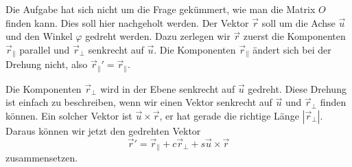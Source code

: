 \begin{diskussion}
Die Aufgabe hat sich nicht um die Frage gekümmert, wie man die Matrix $O$
finden kann.
Dies soll hier nachgeholt werden.
Der Vektor $\vec r$ soll um die Achse $\vec u$ und den Winkel $\varphi$
gedreht werden.
Dazu zerlegen wir $\vec r$ zuerst die Komponenten $\vec r_{\|}$ parallel
und $\vec r_{\perp}$ senkrecht auf $\vec u$.
Die Komponenten $\vec r_{\|}$ ändert sich bei der Drehung nicht, also
$\vec r_{\|}'=\vec r_{\|}$.

Die Komponenten $\vec r_{\perp}$ wird in der Ebene senkrecht auf
$\vec u$ gedreht.
Diese Drehung ist einfach zu beschreiben, wenn wir einen Vektor senkrecht auf
$\vec u$ und $\vec r_{\perp}$ finden können.
Ein solcher Vektor ist $\vec u\times \vec r$, er hat gerade die richtige 
Länge $|\vec r_{\perp}|$.
Daraus können wir jetzt den gedrehten Vektor 
\[
\vec r' = \vec r_{\|} + c \vec r_{\perp} + s \vec u\times \vec r
\]
zusammensetzen.


\end{diskussion}
